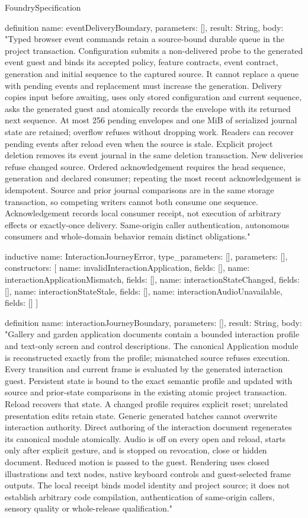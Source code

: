 \begin{lexlean}{FoundrySpecification}
\begin{semanticmodule}
definition{
  name: eventDeliveryBoundary,
  parameters: [],
  result: String,
  body: "Typed browser event commands retain a source-bound durable queue in the project transaction. Configuration submits a non-delivered probe to the generated event guest and binds its accepted policy, feature contracts, event contract, generation and initial sequence to the captured source. It cannot replace a queue with pending events and replacement must increase the generation. Delivery copies input before awaiting, uses only stored configuration and current sequence, asks the generated guest and atomically records the envelope with its returned next sequence. At most 256 pending envelopes and one MiB of serialized journal state are retained; overflow refuses without dropping work. Readers can recover pending events after reload even when the source is stale. Explicit project deletion removes its event journal in the same deletion transaction. New deliveries refuse changed source. Ordered acknowledgement requires the head sequence, generation and declared consumer; repeating the most recent acknowledgement is idempotent. Source and prior journal comparisons are in the same storage transaction, so competing writers cannot both consume one sequence. Acknowledgement records local consumer receipt, not execution of arbitrary effects or exactly-once delivery. Same-origin caller authentication, autonomous consumers and whole-domain behavior remain distinct obligations."
}

inductive{
  name: InteractionJourneyError,
  type_parameters: [],
  parameters: [],
  constructors: [
    {name: invalidInteractionApplication, fields: []},
    {name: interactionApplicationMismatch, fields: []},
    {name: interactionStateChanged, fields: []},
    {name: interactionStateStale, fields: []},
    {name: interactionAudioUnavailable, fields: []}
  ]
}

definition{
  name: interactionJourneyBoundary,
  parameters: [],
  result: String,
  body: "Gallery and garden application documents contain a bounded interaction profile and text-only screen and control descriptions. The canonical Application module is reconstructed exactly from the profile; mismatched source refuses execution. Every transition and current frame is evaluated by the generated interaction guest. Persistent state is bound to the exact semantic profile and updated with source and prior-state comparisons in the existing atomic project transaction. Reload recovers that state. A changed profile requires explicit reset; unrelated presentation edits retain state. Generic generated batches cannot overwrite interaction authority. Direct authoring of the interaction document regenerates its canonical module atomically. Audio is off on every open and reload, starts only after explicit gesture, and is stopped on revocation, close or hidden document. Reduced motion is passed to the guest. Rendering uses closed illustrations and text nodes, native keyboard controls and guest-selected frame outputs. The local receipt binds model identity and project source; it does not establish arbitrary code compilation, authentication of same-origin callers, sensory quality or whole-release qualification."
}


\end{semanticmodule}
\end{lexlean}
